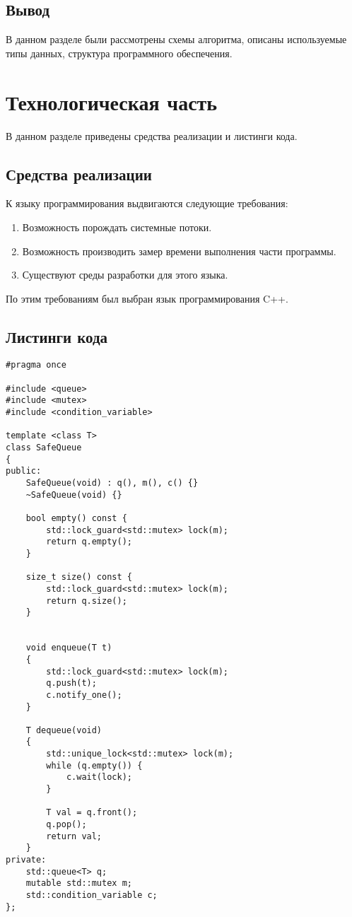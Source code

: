 \subsection{Вывод}

В данном разделе были рассмотрены схемы алгоритма, описаны используемые типы данных, структура программного обеспечения.

\section{Технологическая часть}

В данном разделе приведены средства реализации и листинги кода.

\subsection{Средства реализации}

К языку программирования выдвигаются следующие требования:

\begin{enumerate}
    \item Возможность порождать системные потоки.
    \item Возможность производить замер времени выполнения части программы.
    \item Существуют среды разработки для этого языка.
\end{enumerate}

По этим требованиям был выбран язык программирования C++.

\subsection{Листинги кода}

\begin{lstlisting}[caption=Реализация очереди, label=list:queue, language={}]
#pragma once

#include <queue>
#include <mutex>
#include <condition_variable>

template <class T>
class SafeQueue
{
public:
    SafeQueue(void) : q(), m(), c() {}
    ~SafeQueue(void) {}

    bool empty() const {
        std::lock_guard<std::mutex> lock(m);
        return q.empty();
    }

    size_t size() const {
        std::lock_guard<std::mutex> lock(m);
        return q.size();
    }
    

    void enqueue(T t)
    {
        std::lock_guard<std::mutex> lock(m);
        q.push(t);
        c.notify_one();
    }

    T dequeue(void)
    {
        std::unique_lock<std::mutex> lock(m);
        while (q.empty()) {
            c.wait(lock);
        }

        T val = q.front();
        q.pop();
        return val;
    }
private:
    std::queue<T> q;
    mutable std::mutex m;
    std::condition_variable c;
};	
\end{lstlisting}

